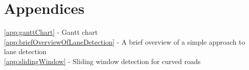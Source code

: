 \documentclass[]{aiaa-tc}%
\begin{document}
%
%
\newpage
\section*{Appendices}
\ref{app:ganttChart} - Gantt chart \\

\ref{app:briefOverviewOfLaneDetection} - A brief overview of a simple approach to lane detection \\

\ref{app:slidingWindow} - Sliding window detection for curved roads \\





%


\appendix
\pagestyle{empty}
 
\end{document}
